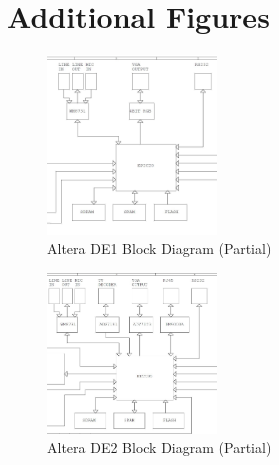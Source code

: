 \documentclass[11pt]{article} %
\begin{document}
\section{Additional Figures} \label{sec:add}
\begin{figure}[h]
\centering
\includegraphics[width=0.4\textwidth]{./images/DE1_schem.jpg}
\caption{Altera DE1 Block Diagram (Partial)}
\label{fig:de1}    
\end{figure}
\begin{figure}[h]
\centering
\includegraphics[width=0.4\textwidth]{./images/DE2_schem.jpg}
\caption{Altera DE2 Block Diagram (Partial)}
\label{fig:de2}    
\end{figure}
\end{document}
